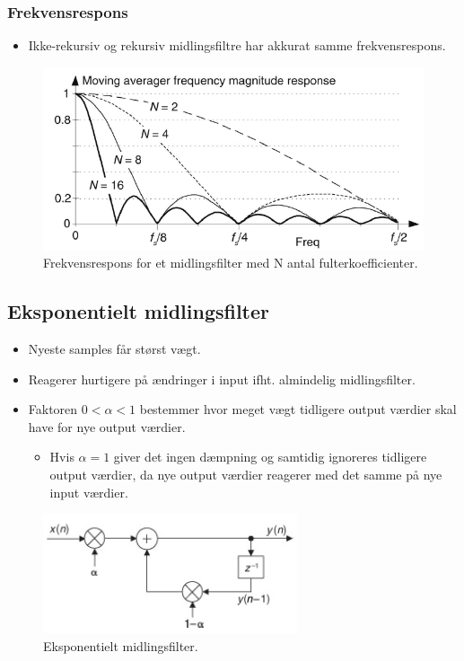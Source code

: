 \documentclass[danish]{article}
\begin{document}
\subsubsection{Frekvensrespons}
\begin{itemize}
	\item Ikke-rekursiv og rekursiv midlingsfiltre har akkurat samme frekvensrespons. 
\end{itemize}

\begin{figure} [H]
	\centering
	\includegraphics[width=0.6\linewidth]{graphics/ma_freqresponse}
	\caption{Frekvensrespons for et midlingsfilter med N antal fulterkoefficienter.}
	\label{fig:ma_freqresponse}
\end{figure}

\subsection{Eksponentielt midlingsfilter}
\begin{itemize}
	\item Nyeste samples får størst vægt.
	\item Reagerer hurtigere på ændringer i input ifht. almindelig midlingsfilter.
	\item Faktoren $0<\si{\alpha}<1$ bestemmer hvor meget vægt tidligere output værdier skal have for nye output værdier.
	\begin{itemize}
		\item Hvis $\si{\alpha}=1$ giver det ingen dæmpning og samtidig ignoreres tidligere output værdier, da nye output værdier reagerer med det samme på nye input værdier.
	\end{itemize}
\end{itemize}

\begin{figure} [H]
	\centering
	\includegraphics[width=0.4\linewidth]{graphics/exponentieltfilter}
	\caption{Eksponentielt midlingsfilter.}
	\label{fig:exponentieltfilter}
\end{figure}
\end{document}
